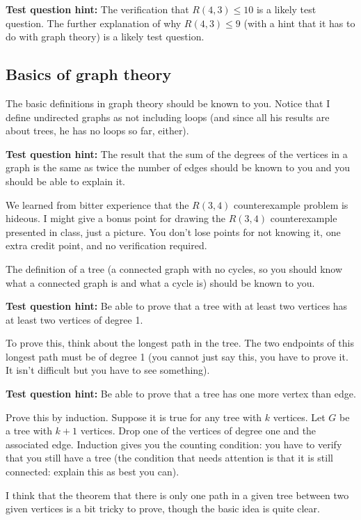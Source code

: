 \documentclass[12pt]{article}
\begin{document}
{\bf Test question hint:}  The verification that $R(4,3) \leq 10$ is a likely test question.  The further explanation of why $R(4,3) \leq 9$ (with a hint that it has to do with graph theory) is a likely test question.

\subsection{Basics of graph theory}

The basic definitions in graph theory should be known to you.  Notice that I define undirected graphs as not including loops (and since all his results are about trees, he has no loops so far, either).

{\bf Test question hint:}  The result that the sum of the degrees of the vertices in a graph is the same as twice the number of edges should be known to you and you should be able to explain it.

We learned from bitter experience that the $R(3,4)$ counterexample problem is hideous.  I might give a bonus point for drawing the $R(3,4)$ counterexample presented in class, just a picture.  You don't lose points for not knowing it, one extra credit point, and no verification required.

The definition of a tree (a connected graph with no cycles, so you should know what a connected graph is and what a cycle is) should be known to you.

{\bf Test question hint:}  Be able to prove that a tree with at least two vertices has at least two vertices of degree 1.

To prove this, think about the longest path in the tree.  The two endpoints of this longest path must be of degree 1 (you cannot just say this, you have to prove it.  It isn't difficult but you have to see something).

{\bf Test question hint:}  Be able to prove that a tree has one more vertex than edge.

Prove this by induction.  Suppose it is true for any tree with $k$ vertices.  Let $G$ be a tree with $k+1$ vertices.
Drop one of the vertices of degree one and the associated edge.  Induction gives you the counting condition:  you have to verify that you still have a tree (the condition that needs attention is that it is still connected:  explain this as best you can).

I think that the theorem that there is only one path in a given tree between two given vertices is a bit tricky to prove, though the basic idea is quite clear.
\end{document}
